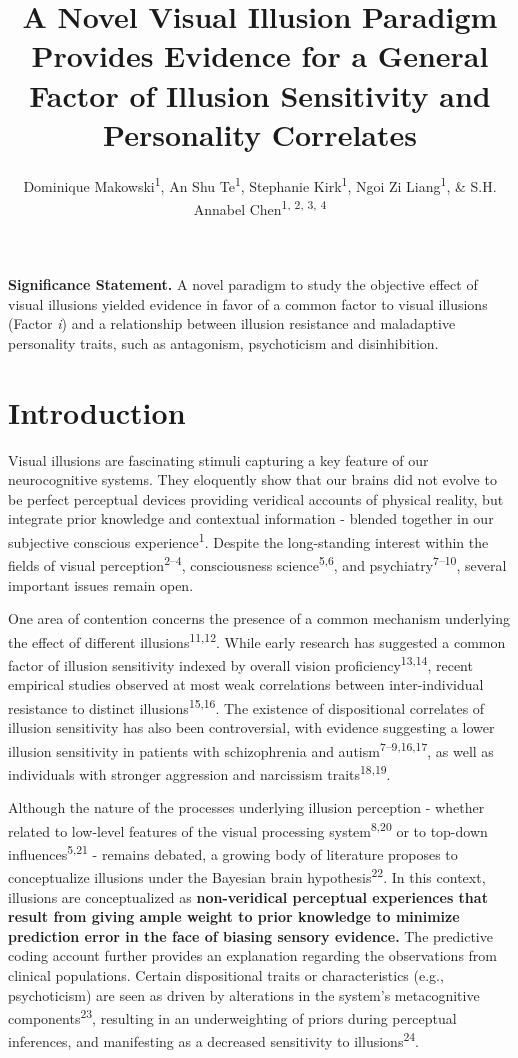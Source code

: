 \documentclass[
  man,floatsintext]{apa6}
\title{\textbf{A Novel Visual Illusion Paradigm Provides Evidence for a General Factor of Illusion Sensitivity and Personality Correlates}}
\author{Dominique Makowski\textsuperscript{1}, An Shu Te\textsuperscript{1}, Stephanie Kirk\textsuperscript{1}, Ngoi Zi Liang\textsuperscript{1}, \& S.H. Annabel Chen\textsuperscript{1, 2, 3, 4}}
\date{}
\affiliation{\vspace{0.5cm}\textsuperscript{1} School of Social Sciences, Nanyang Technological University, Singapore\\\textsuperscript{2} LKC Medicine, Nanyang Technological University, Singapore\\\textsuperscript{3} National Institute of Education, Singapore\\\textsuperscript{4} Centre for Research and Development in Learning, Nanyang Technological University, Singapore}
\begin{document}
\maketitle

\textbf{Significance Statement.} A novel paradigm to study the objective effect of visual illusions yielded evidence in favor of a common factor to visual illusions (Factor \emph{i}) and a relationship between illusion resistance and maladaptive personality traits, such as antagonism, psychoticism and disinhibition.

\hypertarget{introduction}{%
\section{Introduction}\label{introduction}}

Visual illusions are fascinating stimuli capturing a key feature of our neurocognitive systems. They eloquently show that our brains did not evolve to be perfect perceptual devices providing veridical accounts of physical reality, but integrate prior knowledge and contextual information - blended together in our subjective conscious experience\textsuperscript{1}. Despite the long-standing interest within the fields of visual perception\textsuperscript{2--4}, consciousness science\textsuperscript{5,6}, and psychiatry\textsuperscript{7--10}, several important issues remain open.

One area of contention concerns the presence of a common mechanism underlying the effect of different illusions\textsuperscript{11,12}. While early research has suggested a common factor of illusion sensitivity indexed by overall vision proficiency\textsuperscript{13,14}, recent empirical studies observed at most weak correlations between inter-individual resistance to distinct illusions\textsuperscript{15,16}. The existence of dispositional correlates of illusion sensitivity has also been controversial, with evidence suggesting a lower illusion sensitivity in patients with schizophrenia and autism\textsuperscript{7--9,16,17}, as well as individuals with stronger aggression and narcissism traits\textsuperscript{18,19}.

Although the nature of the processes underlying illusion perception - whether related to low-level features of the visual processing system\textsuperscript{8,20} or to top-down influences\textsuperscript{5,21} - remains debated, a growing body of literature proposes to conceptualize illusions under the Bayesian brain hypothesis\textsuperscript{22}. In this context, illusions are conceptualized as \textbf{non-veridical perceptual experiences that result from giving ample weight to prior knowledge to minimize prediction error in the face of biasing sensory evidence.} The predictive coding account further provides an explanation regarding the observations from clinical populations. Certain dispositional traits or characteristics (e.g., psychoticism) are seen as driven by alterations in the system's metacognitive components\textsuperscript{23}, resulting in an underweighting of priors during perceptual inferences, and manifesting as a decreased sensitivity to illusions\textsuperscript{24}.
\end{document}
